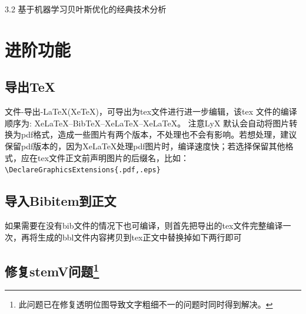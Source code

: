 \documentclass[twoside,longtitle]{LZUthesis}
\begin{document}
3.2 基于机器学习贝叶斯优化的经典技术分析


\chapter{进阶功能}

\section{}


\section{导出\protect\TeX{}\label{sec:export}}

文件-导出-\LaTeX{}(Xe\TeX{})，可导出为tex文件进行进一步编辑，该tex 文件的编译顺序为: Xe\LaTeX{}--Bib\TeX{}--Xe\LaTeX{}--Xe\LaTeX{}。 注意LyX 默认会自动将图片转换为pdf格式，造成一些图片有两个版本，不处理也不会有影响。若想处理，建议保留pdf版本的，因为Xe\LaTeX{}处理pdf图片时，编译速度快；若选择保留其他格式，应在tex文件正文前声明图片的后缀名，比如：\lstinline!\DeclareGraphicsExtensions{.pdf,.eps}!


\section{导入Bibitem到正文}

如果需要在没有bib文件的情况下也可编译，则首先把导出的tex文件完整编译一次，再将生成的bbl文件内容拷贝到tex正文中替换掉如下两行即可



\section[修复stemV问题]{修复stemV问题\footnote{此问题已在修复透明位图导致文字粗细不一的问题时同时得到解决。}}
\end{document}
